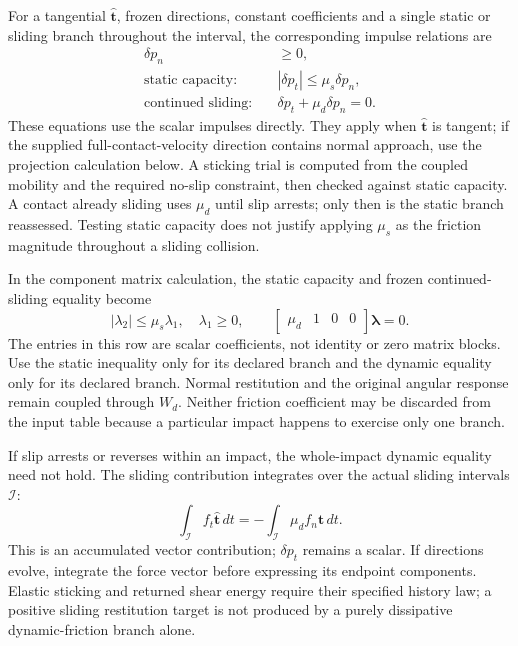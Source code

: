 \documentclass[11pt,a4paper]{article}
\begin{document}
For a tangential $\hat{\mathbf t}$, frozen directions, constant coefficients and a single static or sliding branch throughout the interval, the corresponding impulse relations are
\begin{align}
\delta p_n&\ge0,\\
\text{static capacity:}\quad &|\delta p_t|\le\mu_s\delta p_n,\\
\text{continued sliding:}\quad &\delta p_t+\mu_d\delta p_n=0.
\end{align}
These equations use the scalar impulses directly. They apply when $\hat{\mathbf t}$ is tangent; if the supplied full-contact-velocity direction contains normal approach, use the projection calculation below. A sticking trial is computed from the coupled mobility and the required no-slip constraint, then checked against static capacity. A contact already sliding uses $\mu_d$ until slip arrests; only then is the static branch reassessed. Testing static capacity does not justify applying $\mu_s$ as the friction magnitude throughout a sliding collision.

In the component matrix calculation, the static capacity and frozen continued-sliding equality become
\begin{equation}
|\lambda_2|\le\mu_s\lambda_1,\quad \lambda_1\ge0,\qquad
\begin{bmatrix}\mu_d&1&0&0\end{bmatrix}\boldsymbol\lambda=0.
\end{equation}
The entries in this row are scalar coefficients, not identity or zero matrix blocks. Use the static inequality only for its declared branch and the dynamic equality only for its declared branch. Normal restitution and the original angular response remain coupled through $W_d$. Neither friction coefficient may be discarded from the input table because a particular impact happens to exercise only one branch.

If slip arrests or reverses within an impact, the whole-impact dynamic equality need not hold. The sliding contribution integrates over the actual sliding intervals $\mathcal I$:
\begin{equation}
\int_{\mathcal I}f_t\hat{\mathbf t}\,dt=-\int_{\mathcal I}\mu_d f_n\hat{\mathbf t}\,dt.
\end{equation}
This is an accumulated vector contribution; $\delta p_t$ remains a scalar. If directions evolve, integrate the force vector before expressing its endpoint components. Elastic sticking and returned shear energy require their specified history law; a positive sliding restitution target is not produced by a purely dissipative dynamic-friction branch alone.
\end{document}
